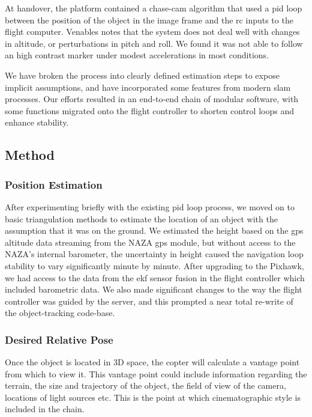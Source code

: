 \documentclass[a4paper, 11pt, titlepage]{article}
\begin{document}
    At handover, the platform contained a chase-cam algorithm that used a \gls{pid} loop between the position of the object in the image frame and the \gls{rc} inputs to the flight computer.  Venables \cite{Venables} notes that the system does not deal well with changes in altitude, or perturbations in pitch and roll.  We found it was not able to follow an high contrast marker under modest accelerations in most conditions.

    We have broken the process into clearly defined estimation steps to expose implicit assumptions, and have incorporated some features from modern \gls{slam} processes.  Our efforts resulted in an end-to-end chain of modular software, with some functions migrated onto the flight controller to shorten control loops and enhance stability. 

  \subsection{Method}

    \subsubsection{Position Estimation}
      After experimenting briefly with the existing \gls{pid} loop process, we moved on to basic triangulation methods to estimate the location of an object with the assumption that it was on the ground.  We estimated the height based on the \gls{gps} altitude data streaming from the NAZA \gls{gps} module, but without access to the NAZA's internal barometer, the uncertainty in height caused the navigation loop stability to vary significantly minute by minute.
      After upgrading to the Pixhawk, we had access to the data from the \gls{ekf} sensor fusion in the flight controller which included barometric data.  We also made significant changes to the way the flight controller was guided by the server, and this prompted a near total re-write of the object-tracking code-base.

    \subsubsection{Desired Relative Pose}
      Once the object is located in 3D space, the copter will calculate a vantage point from which to view it.
      This vantage point could include information regarding the terrain, the size and trajectory of the object, the field of view of the camera, locations of light sources etc.  This is the point at which cinematographic style is included in the chain.
\end{document}
